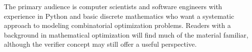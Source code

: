 \documentclass[11pt]{report}
\begin{document}
\vspace{0.6cm}
\noindent
The primary audience is computer scientists and software engineers with
experience in Python and basic discrete mathematics who want a systematic
approach to modeling combinatorial optimization problems. Readers with a
background in mathematical optimization will find much of the material
familiar, although the verifier concept may still offer a useful perspective.
\newpage

\tableofcontents
\clearpage










\end{document}
